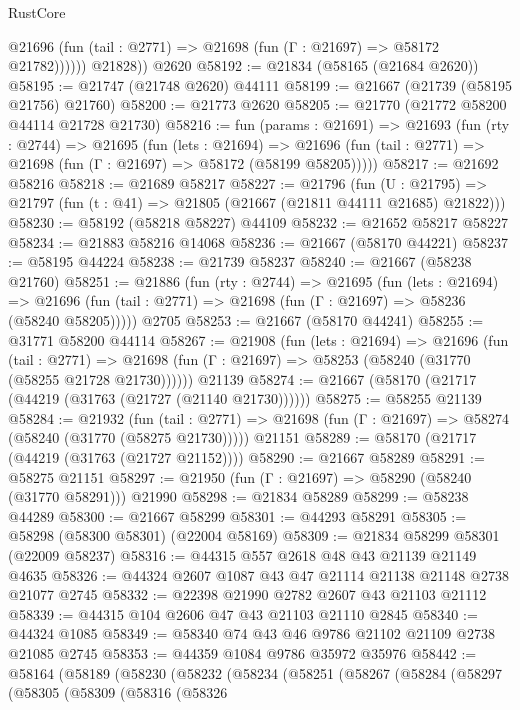 \begin{lexlean}{RustCore}
\begin{coremodule}
              @21696 (fun (tail : @2771) => @21698 (fun (Γ : @21697) => @58172 @21782))))))
        @21828))
    @2620
@58192 := @21834 (@58165 (@21684 @2620))
@58195 := @21747 (@21748 @2620) @44111
@58199 := @21667 (@21739 (@58195 @21756) @21760)
@58200 := @21773 @2620
@58205 := @21770 (@21772 @58200 @44114 @21728 @21730)
@58216 := fun (params : @21691) =>
  @21693
    (fun (rty : @2744) =>
    @21695
      (fun (lets : @21694) =>
      @21696 (fun (tail : @2771) => @21698 (fun (Γ : @21697) => @58172 (@58199 @58205)))))
@58217 := @21692 @58216
@58218 := @21689 @58217
@58227 := @21796
    (fun (U : @21795) => @21797 (fun (t : @41) => @21805 (@21667 (@21811 @44111 @21685) @21822)))
@58230 := @58192 (@58218 @58227) @44109
@58232 := @21652 @58217 @58227
@58234 := @21883 @58216 @14068
@58236 := @21667 (@58170 @44221)
@58237 := @58195 @44224
@58238 := @21739 @58237
@58240 := @21667 (@58238 @21760)
@58251 := @21886
    (fun (rty : @2744) =>
    @21695
      (fun (lets : @21694) =>
      @21696 (fun (tail : @2771) => @21698 (fun (Γ : @21697) => @58236 (@58240 @58205)))))
    @2705
@58253 := @21667 (@58170 @44241)
@58255 := @31771 @58200 @44114
@58267 := @21908
    (fun (lets : @21694) =>
    @21696
      (fun (tail : @2771) =>
      @21698 (fun (Γ : @21697) => @58253 (@58240 (@31770 (@58255 @21728 @21730))))))
    @21139
@58274 := @21667 (@58170 (@21717 (@44219 (@31763 (@21727 (@21140 @21730))))))
@58275 := @58255 @21139
@58284 := @21932
    (fun (tail : @2771) => @21698 (fun (Γ : @21697) => @58274 (@58240 (@31770 (@58275 @21730)))))
    @21151
@58289 := @58170 (@21717 (@44219 (@31763 (@21727 @21152))))
@58290 := @21667 @58289
@58291 := @58275 @21151
@58297 := @21950 (fun (Γ : @21697) => @58290 (@58240 (@31770 @58291))) @21990
@58298 := @21834 @58289
@58299 := @58238 @44289
@58300 := @21667 @58299
@58301 := @44293 @58291
@58305 := @58298 (@58300 @58301) (@22004 @58169)
@58309 := @21834 @58299 @58301 (@22009 @58237)
@58316 := @44315 @557 @2618 @48 @43 @21139 @21149 @4635
@58326 := @44324 @2607 @1087 @43 @47 @21114 @21138 @21148 @2738 @21077 @2745
@58332 := @22398 @21990 @2782 @2607 @43 @21103 @21112
@58339 := @44315 @104 @2606 @47 @43 @21103 @21110 @2845
@58340 := @44324 @1085
@58349 := @58340 @74 @43 @46 @9786 @21102 @21109 @2738 @21085 @2745
@58353 := @44359 @1084 @9786 @35972 @35976
@58442 := @58164
    (@58189
      (@58230
        (@58232
          (@58234
            (@58251
              (@58267
                (@58284
                  (@58297
                    (@58305
                      (@58309
                        (@58316
                          (@58326

\end{coremodule}
\end{lexlean}
